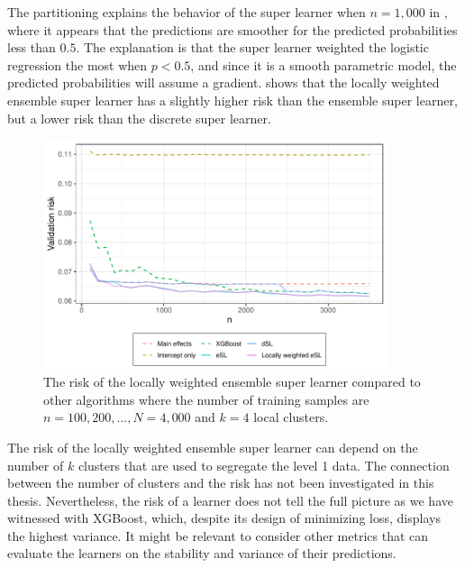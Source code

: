 \documentclass[./main.tex]{subfiles}
\begin{document}
The partitioning explains the behavior of the super learner when $ n = 1,000 $ in , where it appears that the predictions are smoother for the predicted probabilities less than $ 0.5 $. The explanation is that the super learner weighted the logistic regression the most when $ p < 0.5 $, and since it is a smooth parametric model, the predicted probabilities will assume a gradient. 
 shows that the locally weighted ensemble super learner has a slightly higher risk than the ensemble super learner, but a lower risk than the discrete super learner. 
\begin{figure}[H]
    \centering
    \includegraphics[width=0.9\textwidth]{figures/losses_esl_lw_s22.pdf}
    \caption{The risk of the locally weighted ensemble super learner compared to other algorithms where the number of training samples are $ n = 100, 200, \dots , N = 4,000 $ and $ k = 4 $ local clusters.}
    \label{fig:losses_esl_lw}
\end{figure}
The risk of the locally weighted ensemble super learner can depend on the number of $ k $ clusters that are used to segregate the level 1 data. The connection between the number of clusters and the risk has not been investigated in this thesis. Nevertheless, the risk of a learner does not tell the full picture as we have witnessed with XGBoost, which, despite its design of minimizing loss, displays the highest variance. It might be relevant to consider other metrics that can evaluate the learners on the stability and variance of their predictions. 
\end{document}
